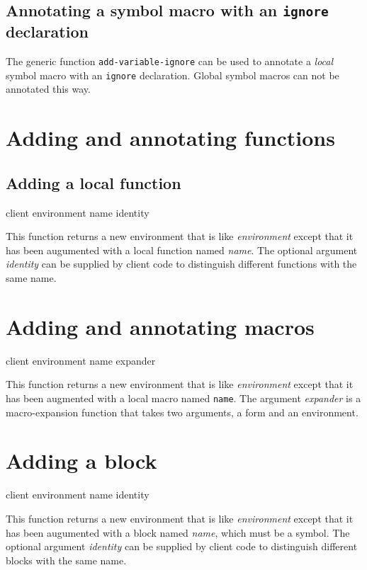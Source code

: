 \subsection{Annotating a symbol macro with an \texttt{ignore} declaration}
\label{sec-annotating-a-local-symbol-macro-with-ignore}

The generic function \texttt{add-variable-ignore}
 can be used to annotate
a \emph{local} symbol macro with an \texttt{ignore} declaration.
Global symbol macros can not be annotated this way.

\section{Adding and annotating functions}

\subsection{Adding a local function}

{\footnotesize
{} {client environment name \optional identity}
}

This function returns a new environment that is like
\textit{environment} except that it has been augumented with a local
function named \textit{name}.  The optional argument \textit{identity}
can be supplied by client code to distinguish different functions with
the same name.

\section{Adding and annotating macros}

{\footnotesize
{} {client environment name expander}
}

This function returns a new environment that is like
\textit{environment} except that it has been augmented with a local
macro named \texttt{name}.  The argument \textit{expander} is a
macro-expansion function that takes two arguments, a form and an
environment.

\section{Adding a block}

{\footnotesize
{} {client environment name \optional identity}
}

This function returns a new environment that is like
\textit{environment} except that it has been augumented with a block
named \textit{name}, which must be a symbol.  The optional argument
\textit{identity} can be supplied by client code to distinguish
different blocks with the same name.

